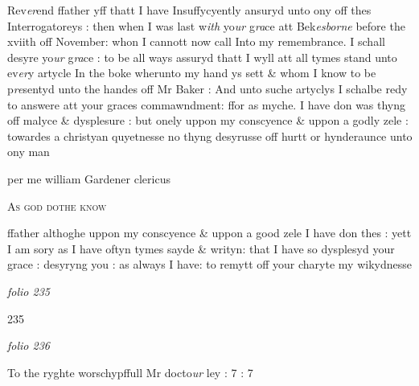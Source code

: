 \documentclass[12pt, a4paper]{book}
\begin{document}
		\ifthenelse{\isodd{\thepage}}
		{\reversemarginpar}
		{\normalmarginpar}
		Rev\textit{er}end ffather yff thatt I have Insuffycyently ansuryd unto
ony off thes Interrogatoreys : then when I was last w\textit{ith} yo\textit{ur} g\textit{ra}ce
att Bek\textit{esborne} before the xviith off November: whon I cannott now call Into
my remembrance. I schall desyre yo\textit{ur} g\textit{ra}ce : to be all ways assuryd
thatt I wyll att all tymes stand unto ev\textit{er}y artycle In the boke
wherunto my hand ys sett \& whom I know to be p\textit{re}sentyd unto
the handes off Mr Baker : And unto suche artyclys I schalbe
redy to answere att your graces commawndment: ffor as myche. I
have don was thyng off malyce \& dysplesure : but onely uppon
my conscyence \& uppon a godly zele : towardes a christyan quyetnesse
no thyng desyrusse off hurtt or hynderaunce unto ony man

		\ifthenelse{\isodd{\thepage}}
		{\reversemarginpar}
		{\normalmarginpar}
		per me william Gardener
 clericus

				\begin{center} \begin{large} {\scshape As god dothe know} \end{large} \end{center}
			

		\ifthenelse{\isodd{\thepage}}
		{\reversemarginpar}
		{\normalmarginpar}
		ffather althoghe uppon my conscyence \& uppon a good zele I have don thes : yett
	I am sory as I have oftyn tymes sayde \& writyn: that I have so dysplesyd your
grace : desyryng you : as always I have: to remytt off your charyte my wikydnesse 

               
\dotfill
						\newpage
{}

\textit{folio 235}


\begin{flushright}{\color{Mahogany}235}\end{flushright}

\dotfill
						\newpage
{}

\textit{folio 236}


 	
		\ifthenelse{\isodd{\thepage}}
		{\reversemarginpar}
		{\normalmarginpar}
		To the ryghte worschypffull 
Mr docto\textit{ur} ley : 7 : 7

\dotfill
						\newpage {} \section*{}  \subsection*{}
\end{document}
